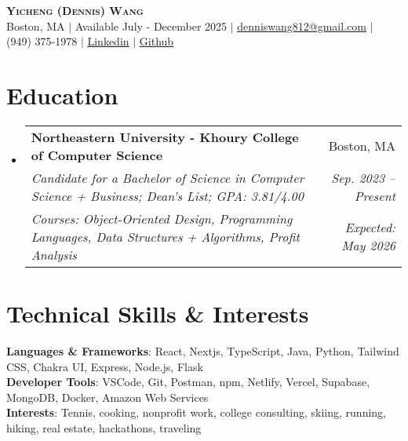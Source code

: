 \documentclass[letterpaper,11pt]{article}
\makeatletter
\newcommand{\eduSubheading}[6]{
  \vspace{-2pt}\item
    \begin{tabular*}{0.97\textwidth}[t]{l@{\extracolsep{\fill}}r}
      \textbf{#1} & #2 \\
      \vspace{-2pt}
      \textit{\small#3} & \hspace{-10cm}\textit{\small #4} \\
      
      \textit{\footnotesize#5}&\textit{\small #6} \\
    \end{tabular*}\vspace{-6pt}
}
\newcommand{\resumeSubHeadingListStart}{\begin{itemize}[leftmargin=0.15in, label={}]}
\newcommand{\resumeSubHeadingListEnd}{\end{itemize}}
\makeatother
\begin{document}

\begin{center}
\textbf{\Huge \scshape Yicheng (Dennis) Wang} \\ \vspace{1pt}
\small Boston, MA  $|$ Available July - December 2025 $|$ \href{mailto:denniswang812@gmail.com}{\underline{denniswang812@gmail.com}} $|$ (949) 375-1978 $|$ \href{https://www.linkedin.com/in/denniswang812/}{\underline{Linkedin}} $|$ \href{https://github.com/denniwang}{\underline{Github}} 
\end{center} 


\section{Education}
  \resumeSubHeadingListStart
    \eduSubheading
      {Northeastern University - Khoury College of Computer Science}{Boston, MA}
      {Candidate for a Bachelor of Science in Computer Science + Business; Dean's List; GPA: 3.81/4.00 } {Sep. 2023 -- Present}
       {Courses: Object-Oriented Design, Programming Languages, Data Structures + Algorithms, Profit Analysis}{Expected: May 2026}
  \resumeSubHeadingListEnd


\section{Technical Skills \& Interests}
 \begin{itemize}[leftmargin=0.15in, label={}]
    \small{\item{
     \textbf{Languages \& Frameworks}{: React, Nextjs, TypeScript, Java, Python, Tailwind CSS, Chakra UI, Express, Node.js, Flask} \\
     \textbf{Developer Tools}{: VSCode, Git, Postman, npm, Netlify, Vercel, Supabase, MongoDB, Docker,  Amazon Web Services} \\
     \textbf{Interests}{: Tennis, cooking, nonprofit work, college consulting, skiing, running, hiking, real estate, hackathons, traveling}
     \vspace{-5pt}
    }}
    
 \end{itemize}

\end{document}
